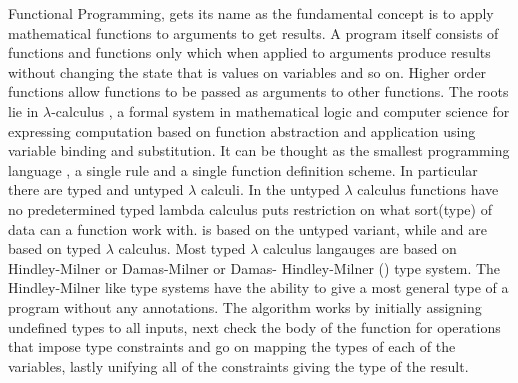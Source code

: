 \documentclass[thesis-solanki.tex]{subfiles}
\begin{document}
Functional Programming, \cite{hughes1989functional} gets its name as the fundamental concept is to apply
mathematical functions to arguments to get results.
A program itself consists of functions and functions only which when applied to arguments produce results without
changing the state that is values on variables and so on.
Higher order functions allow functions to be passed as arguments to other functions.
The roots lie in $\lambda$-calculus \cite{website:lambdacalculuswiki}, a formal system in mathematical logic and
computer science for expressing computation based on function abstraction and application using variable binding
and substitution.
It can be thought as the smallest programming language \cite{rojas2004tutorial}, a single rule and a single
function definition scheme.
In particular there are typed and untyped $\lambda$ calculi.
In the untyped $\lambda$ calculus functions have no predetermined  typed lambda calculus puts
restriction on what sort\yyy{}{\Verb[showspaces]! !}(type) of data can a function work with.
 is based on the untyped variant, while  and  are based on typed
$\lambda$ calculus.
Most typed $\lambda$ calculus langauges are based on Hindley-Milner or Damas-Milner or Damas- Hindley-Milner
(\cite{hindley1969principal,milner1978theory,website:hdmtypesystemwiki}) type system.
The Hindley-Milner like type systems have the ability to give a most general type of a program without any
annotations. 
The algorithm \cite{website:hdmtypesystem} works by initially assigning undefined types to all inputs, next check
the body of the function for operations that impose type constraints and go on mapping the types of each of the
variables, lastly unifying all of the constraints giving the type of the result.
\end{document}
